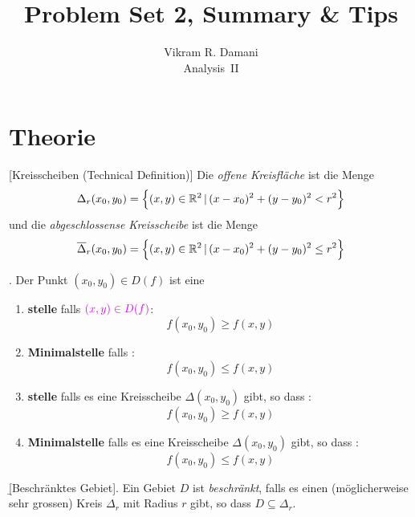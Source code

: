 \documentclass[12pt]{article}
\begin{document}
\title{\vspace*{-2.5em}Problem Set 2, Summary \& Tips}
\author{Vikram R. Damani\\
    Analysis~II}

\maketitle

\section{Theorie}

\begin{defn}{[Kreisscheiben (Technical Definition)]}
    Die \emph{offene Kreisfläche} ist die Menge
    \begin{align*}
        \Delta_r(x_0,y_0)=\left\{(x,y)\in\mathbb{R}^2\,|\,(x-x_0)^2+(y-y_0)^2<r^2\right\}
    \end{align*}
    und die \emph{abgeschlossense Kreisscheibe} ist die Menge
    \begin{align*}
        \overline{\Delta}_r(x_0,y_0)=\left\{(x,y)\in\mathbb{R}^2\,|\,(x-x_0)^2+(y-y_0)^2\leq r^2\right\}
    \end{align*}
\end{defn}

\begin{thmb}{\np{\emph{[Extrema]}}.}
    Der Punkt $(x_0,y_0)\in D(f)$ ist eine
    \begin{enumerate}[label=(\alph*), topsep=0pt, itemsep=0.15em]
        \item \textbf{ stelle} falls  $\p{(x,y)\in D(f)}$: \[f(x_0,y_0)\geq f(x,y)\]
        \item \textbf{ \r{Minimal}stelle} falls : \[f(x_0,y_0)\leq f(x,y)\]
        \item \textbf{ stelle} falls es eine Kreisscheibe $\Delta(x_0,y_0)$ gibt, so dass : \[f(x_0,y_0)\geq f(x,y)\]
        \item \textbf{ \r{Minimal}stelle} falls es eine Kreisscheibe $\Delta(x_0,y_0)$ gibt, so dass : \[f(x_0,y_0)\leq f(x,y)\]
    \end{enumerate}
\end{thmb}\vspace*{1em}

\begin{defn}{\b{[Beschränktes Gebiet].}}
    Ein Gebiet $D$ ist \emph{beschränkt}, falls es einen (möglicherweise sehr grossen) Kreis $\Delta_r$ mit Radius $r$ gibt, so dass $D\subseteq\Delta_r$.
\end{defn}
\end{document}
